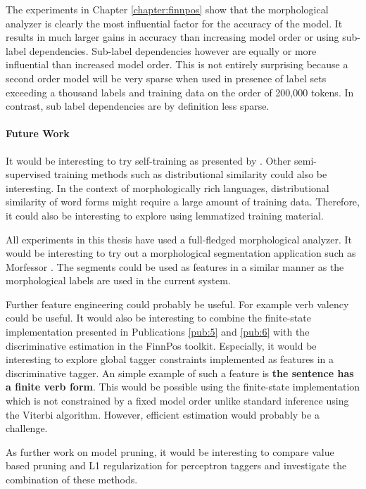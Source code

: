 The experiments in Chapter \ref{chapter:finnpos} show that the
morphological analyzer is clearly the most influential factor for the
accuracy of the model. It results in much larger gains in accuracy
than increasing model order or using sub-label dependencies. Sub-label
dependencies however are equally or more influential than increased
model order. This is not entirely surprising because a second order
model will be very sparse when used in presence of label sets
exceeding a thousand labels and training data on the order of 200,000
tokens. In contrast, sub label dependencies are by definition less
sparse.

\paragraph{Future Work} It would be interesting to try self-training
as presented by \cite{Sogaard2011}. Other semi-supervised training
methods such as distributional similarity could also be
interesting. In the context of morphologically rich languages,
distributional similarity of word forms might require a large amount
of training data. Therefore, it could also be interesting to explore
using lemmatized training material.

All experiments in this thesis have used a full-fledged morphological
analyzer. It would be interesting to try out a morphological
segmentation application such as Morfessor \citep{Creutz2002}. The
segments could be used as features in a similar manner as the
morphological labels are used in the current system.

Further feature engineering could probably be useful. For example verb
valency could be useful. It would also be interesting to combine the
finite-state implementation presented in Publications \ref{pub:5} and
\ref{pub:6} with the discriminative estimation in the FinnPos
toolkit. Especially, it would be interesting to explore global tagger
constraints implemented as features in a discriminative tagger. An
simple example of such a feature is {\bf the sentence has a finite
  verb form}. This would be possible using the finite-state
implementation which is not constrained by a fixed model order unlike
standard inference using the Viterbi algorithm. However, efficient
estimation would probably be a challenge.

As further work on model pruning, it would be interesting to compare
value based pruning and L1 regularization for perceptron taggers and
investigate the combination of these methods.

